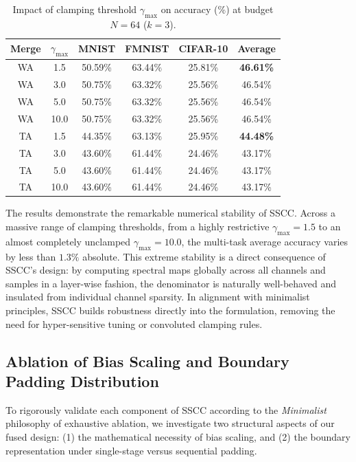 \documentclass{article}
\theoremstyle{plain}
\theoremstyle{definition}
\theoremstyle{remark}
\begin{document}
\begin{table}[h]
\caption{Impact of clamping threshold $\gamma_{\text{max}}$ on accuracy (\%) at budget $N=64$ ($k=3$).}
\label{tab:ablation_clamp}
\vskip 0.05in
\begin{center}\setlength{\tabcolsep}{4pt}
\begin{small}
\begin{tabular}{cccccc}
\toprule
Merge & $\gamma_{\text{max}}$ & MNIST & FMNIST & CIFAR-10 & Average \\
\midrule
WA & 1.5 & 50.59\% & 63.44\% & 25.81\% & \textbf{46.61\%} \\
WA & 3.0 & 50.75\% & 63.32\% & 25.56\% & 46.54\% \\
WA & 5.0 & 50.75\% & 63.32\% & 25.56\% & 46.54\% \\
WA & 10.0 & 50.75\% & 63.32\% & 25.56\% & 46.54\% \\
\midrule
TA & 1.5 & 44.35\% & 63.13\% & 25.95\% & \textbf{44.48\%} \\
TA & 3.0 & 43.60\% & 61.44\% & 24.46\% & 43.17\% \\
TA & 5.0 & 43.60\% & 61.44\% & 24.46\% & 43.17\% \\
TA & 10.0 & 43.60\% & 61.44\% & 24.46\% & 43.17\% \\
\bottomrule
\end{tabular}
\end{small}
\end{center}
\vskip -0.1in
\end{table}

The results demonstrate the remarkable numerical stability of SSCC. Across a massive range of clamping thresholds, from a highly restrictive $\gamma_{\text{max}}=1.5$ to an almost completely unclamped $\gamma_{\text{max}}=10.0$, the multi-task average accuracy varies by less than $1.3\%$ absolute. This extreme stability is a direct consequence of SSCC's design: by computing spectral maps globally across all channels and samples in a layer-wise fashion, the denominator is naturally well-behaved and insulated from individual channel sparsity. In alignment with minimalist principles, SSCC builds robustness directly into the formulation, removing the need for hyper-sensitive tuning or convoluted clamping rules.

\subsection{Ablation of Bias Scaling and Boundary Padding Distribution}
To rigorously validate each component of SSCC according to the \textit{Minimalist} philosophy of exhaustive ablation, we investigate two structural aspects of our fused design: (1) the mathematical necessity of bias scaling, and (2) the boundary representation under single-stage versus sequential padding.
\end{document}
